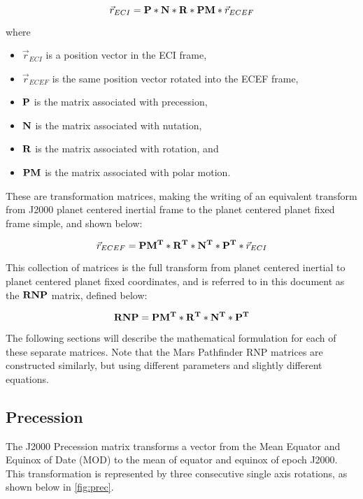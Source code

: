 \begin{equation}\label{base_rnp_transform}
\vec{r}_{ECI} = {\bf P} * {\bf N} * {\bf R} * {\bf PM} * \vec{r}_{ECEF}
\end{equation}

where

\begin{itemize}
\item $\vec{r}_{ECI}$ is a position vector in the ECI frame,
\item $\vec{r}_{ECEF}$ is the same position vector rotated into the ECEF frame,
\item ${\bf P}$ is the matrix associated with precession,
\item ${\bf N}$ is the matrix associated with nutation,
\item ${\bf R}$ is the matrix associated with rotation, and
\item ${\bf PM}$ is the matrix associated with polar motion.
\end{itemize}

These are transformation matrices, making the writing of an equivalent transform
from J2000 planet centered inertial frame to the planet centered planet fixed
frame simple, and shown below:

\begin{equation}\label{backwards_rnp_transform}
\vec{r}_{ECEF} = {\bf PM^T} * {\bf R^T} * {\bf N^T} * {\bf P^T} * \vec{r}_{ECI}
\end{equation}

This collection of matrices is the full transform from planet centered inertial
to planet centered planet fixed coordinates, and is
referred to in this document as the ${\bf RNP}$ matrix, defined below:

\begin{equation}\label{rnp_definition}
{\bf RNP} = {\bf PM^T} * {\bf R^T} * {\bf N^T} * {\bf P^T}
\end{equation}


The following sections will describe the mathematical formulation for each
of these separate matrices. Note that the Mars Pathfinder RNP matrices are
constructed similarly, but using different parameters and slightly different
equations.

\subsection{Precession}

The J2000 Precession matrix transforms a vector from the Mean Equator
and Equinox of Date (MOD) to the mean of
equator and equinox of epoch J2000. This transformation is represented by
three consecutive single axis rotations, as shown below in
\ref{fig:prec}.

